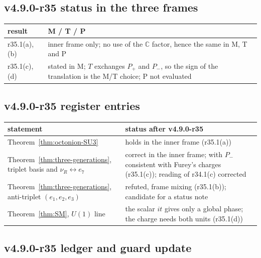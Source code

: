 \subsection*{v4.9.0-r35 status in the three frames}
\label{subsec:v490-r35-frames}

\begin{center}
\small
\begin{tabular}{@{}>{\raggedright\arraybackslash}p{}>{\raggedright\arraybackslash}p{}@{}}
\toprule
result & M / T / P\\
\midrule
r35.1(a), (b) & inner frame only; no use of the \(\mathbb C\) factor, hence the same in M, T and P\\
r35.1(c), (d) & stated in M; \(T\) exchanges \(P_+\) and \(P_-\), so the sign of the translation is the M/T choice; P not evaluated\\
\bottomrule
\end{tabular}
\end{center}

\subsection*{v4.9.0-r35 register entries}
\label{subsec:v490-r35-register}

\begin{center}
\small
\begin{tabular}{@{}>{\raggedright\arraybackslash}p{}>{\raggedright\arraybackslash}p{}@{}}
\toprule
statement & status after v4.9.0-r35\\
\midrule
Theorem~\ref{thm:octonion-SU3} & holds in the inner frame (r35.1(a))\\
Theorem~\ref{thm:three-generations}, triplet basis and \(\nu_R\leftrightarrow e_7\) & correct in the inner frame; with \(P_-\) consistent with Furey's charges (r35.1(c)); reading of r34.1(c) corrected\\
Theorem~\ref{thm:three-generations}, anti-triplet \((e_1,e_2,e_3)\) & refuted, frame mixing (r35.1(b)); candidate for a status note\\
Theorem~\ref{thm:SM}, \(U(1)\) line & the scalar \(it\) gives only a global phase; the charge needs both units (r35.1(d))\\
\bottomrule
\end{tabular}
\end{center}

\subsection*{v4.9.0-r35 ledger and guard update}
\label{subsec:v490-r35-ledger-guard}

